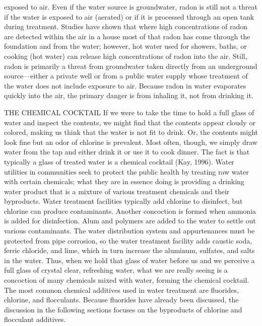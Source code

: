 \documentclass{article}
\begin{document}
exposed to air. Even if the water source is groundwater, radon is still
not a threat if the water is exposed to air (aerated) or if it is
processed through an open tank during treatment. Studies have shown that
where high concentrations of radon are detected within the air in a
house most of that radon has come through the foundation and from the
water; however, hot water used for showers, baths, or cooking (hot
water) can release high concentrations of radon into the air. Still,
radon is primarily a threat from groundwater taken directly from an
underground source---either a private well or from a public water supply
whose treatment of the water does not include exposure to air. Because
radon in water evaporates quickly into the air, the primary danger is
from inhaling it, not from drinking it.

THE CHEMICAL COCKTAIL If we were to take the time to hold a full glass
of water and inspect the contents, we might find that the contents
appear cloudy or colored, making us think that the water is not fit to
drink. Or, the contents might look fine but an odor of chlorine is
prevalent. Most often, though, we simply draw water from the tap and
either drink it or use it to cook dinner. The fact is that typically a
glass of treated water is a chemical cocktail (Kay, 1996). Water
utilities in communities seek to protect the public health by treating
raw water with certain chemicals; what they are in essence doing is
providing a drinking water product that is a mixture of various
treatment chemicals and their byproducts. Water treatment facilities
typically add chlorine to disinfect, but chlorine can produce
contaminants. Another concoction is formed when ammonia is added for
disinfection. Alum and polymers are added to the water to settle out
various contaminants. The water distribution system and appurtenances
must be protected from pipe corrosion, so the water treatment facility
adds caustic soda, ferric chloride, and lime, which in turn increase the
aluminum, sulfates, and salts in the water. Thus, when we hold that
glass of water before us and we perceive a full glass of crystal clear,
refreshing water, what we are really seeing is a concoction of many
chemicals mixed with water, forming the chemical cocktail. The most
common chemical additives used in water treatment are fluorides,
chlorine, and flocculants. Because fluorides have already been
discussed, the discussion in the following sections focuses on the
byproducts of chlorine and flocculant additives.
\end{document}
